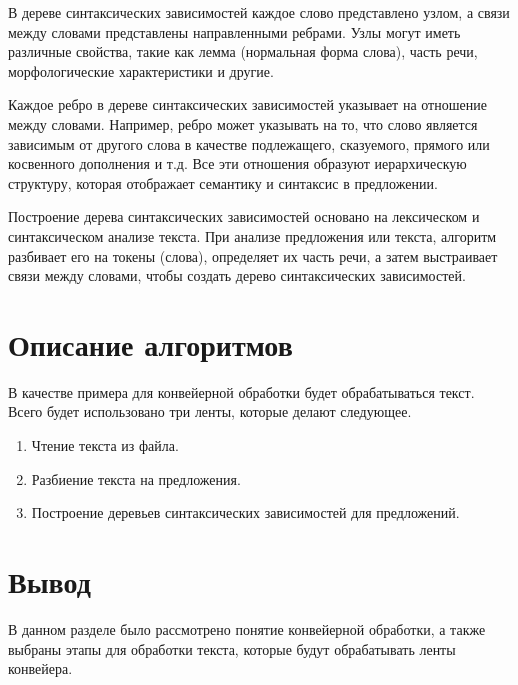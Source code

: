 В дереве синтаксических зависимостей каждое слово представлено узлом, а связи между словами представлены направленными ребрами. 
Узлы могут иметь различные свойства, такие как лемма (нормальная форма слова), часть речи, морфологические характеристики и другие.

Каждое ребро в дереве синтаксических зависимостей указывает на отношение между словами. 
Например, ребро может указывать на то, что слово является зависимым от другого слова в качестве подлежащего, сказуемого, прямого или косвенного дополнения и т.д. 
Все эти отношения образуют иерархическую структуру, которая отображает семантику и синтаксис в предложении.

Построение дерева синтаксических зависимостей основано на лексическом и синтаксическом анализе текста. 
При анализе предложения или текста, алгоритм разбивает его на токены (слова), определяет их часть речи, а затем выстраивает связи между словами, чтобы создать дерево синтаксических зависимостей.

\section{Описание алгоритмов}

В качестве примера для конвейерной обработки будет обрабатываться текст. Всего будет использовано три ленты, которые делают следующее.

\begin{enumerate}[label=\arabic*)]
	\item Чтение текста из файла.
	\item Разбиение текста на предложения.
	\item Построение деревьев синтаксических зависимостей для предложений.
\end{enumerate}


\section{Вывод}

В данном разделе было рассмотрено понятие конвейерной обработки, а также выбраны этапы для обработки текста, которые будут обрабатывать ленты конвейера.